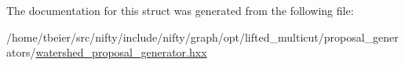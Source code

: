 The documentation for this struct was generated from the following file\+:\begin{DoxyCompactItemize}
\item 
/home/tbeier/src/nifty/include/nifty/graph/opt/lifted\+\_\+multicut/proposal\+\_\+generators/\hyperlink{lifted__multicut_2proposal__generators_2watershed__proposal__generator_8hxx}{watershed\+\_\+proposal\+\_\+generator.\+hxx}\end{DoxyCompactItemize}
